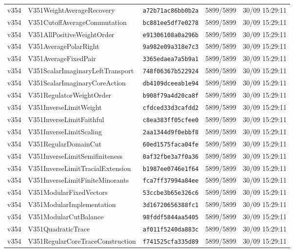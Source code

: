 \documentclass[11pt]{article}
\theoremstyle{definition}\newtheorem{deriv}{Derivation}
\begin{document}
{\begin{longtable}{@{}lllll@{}}
v354 & V351WeightAverageRecovery & \texttt{a72b71ac86bb0b2a} & 5899/5899 & 30/09 15:29:11 \\
v354 & V351CutoffAverageCommutation & \texttt{bc881ee5df7e0278} & 5899/5899 & 30/09 15:29:11 \\
v354 & V351AllPositiveWeightOrder & \texttt{e91306108a0a296b} & 5899/5899 & 30/09 15:29:11 \\
v354 & V351AveragePolarRight & \texttt{9a982e09a318e7c3} & 5899/5899 & 30/09 15:29:11 \\
v354 & V351AverageFixedPair & \texttt{3365edaea7a5b9a1} & 5899/5899 & 30/09 15:29:11 \\
v354 & V351ScalarImaginaryLeftTransport & \texttt{748f06367b522924} & 5899/5899 & 30/09 15:29:11 \\
v354 & V351ScalarImaginaryCoreAction & \texttt{db4109dceeab1e94} & 5899/5899 & 30/09 15:29:11 \\
v354 & V351RegulatorWeightOrder & \texttt{b908f79a4d20ca8f} & 5899/5899 & 30/09 15:29:11 \\
v354 & V351InverseLimitWeight & \texttt{cfdced33d3cafdd2} & 5899/5899 & 30/09 15:29:11 \\
v354 & V351InverseLimitFaithful & \texttt{c8ea383ff05cfee0} & 5899/5899 & 30/09 15:29:11 \\
v354 & V351InverseLimitScaling & \texttt{2aa1344d9f0ebbf8} & 5899/5899 & 30/09 15:29:11 \\
v354 & V351RegularDomainCut & \texttt{60ed1575faca04fe} & 5899/5899 & 30/09 15:29:11 \\
v354 & V351InverseLimitSemifiniteness & \texttt{0af32fbe3a7f0a36} & 5899/5899 & 30/09 15:29:11 \\
v354 & V351InverseLimitTracialExtension & \texttt{b1987ee0746e1f64} & 5899/5899 & 30/09 15:29:11 \\
v354 & V351InverseLimitFiniteMinorants & \texttt{fca7ff37994a84ee} & 5899/5899 & 30/09 15:29:11 \\
v354 & V351ModularFixedVectors & \texttt{53ccbe3b65e326c6} & 5899/5899 & 30/09 15:29:11 \\
v354 & V351ModularImplementation & \texttt{3d16720656388fc1} & 5899/5899 & 30/09 15:29:11 \\
v354 & V351ModularCutBalance & \texttt{98fddf5844aa5405} & 5899/5899 & 30/09 15:29:11 \\
v354 & V351QuadraticTrace & \texttt{af011f5240da883c} & 5899/5899 & 30/09 15:29:11 \\
v354 & V351RegularCoreTraceConstruction & \texttt{f741525cfa335d89} & 5899/5899 & 30/09 15:29:11 \\

\end{longtable}}
\end{document}

